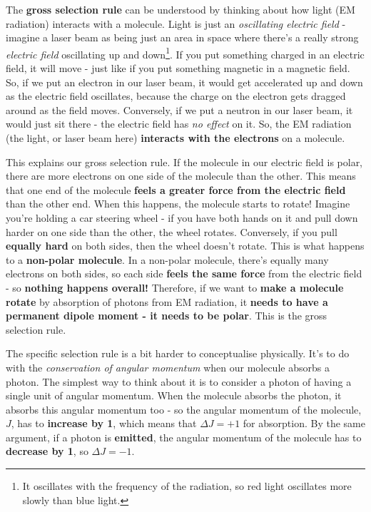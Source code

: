 \documentclass{memoir}[11pt,oneside,a4paper,openany]
\begin{document}
The \textbf{gross selection rule} can be understood by thinking about how light (EM radiation) interacts with a molecule. Light is just an \emph{oscillating electric field} - imagine a laser beam as being just an area in space where there's a really strong \emph{electric field} oscillating up and down\footnote{It oscillates with the frequency of the radiation, so red light oscillates more slowly than blue light.}. If you put something charged in an electric field, it will move - just like if you put something magnetic in a magnetic field. So, if we put an electron in our laser beam, it would get accelerated up and down as the electric field oscillates, because the charge on the electron gets dragged around as the field moves. Conversely, if we put a neutron in our laser beam, it would just sit there - the electric field has \emph{no effect} on it. So, the EM radiation (the light, or laser beam here) \textbf{interacts with the electrons} on a molecule. 

This explains our gross selection rule. If the molecule in our electric field is polar, there are more electrons on one side of the molecule than the other. This means that one end of the molecule \textbf{feels a greater force from the electric field} than the other end. When this happens, the molecule starts to rotate! Imagine you're holding a car steering wheel - if you have both hands on it and pull down harder on one side than the other, the wheel rotates. Conversely, if you pull \textbf{equally hard} on both sides, then the wheel doesn't rotate. This is what happens to a \textbf{non-polar molecule}. In a non-polar molecule, there's equally many electrons on both sides, so each side \textbf{feels the same force} from the electric field - so \textbf{nothing happens overall!} Therefore, if we want to \textbf{make a molecule rotate} by absorption of photons from EM radiation, it \textbf{needs to have a permanent dipole moment - it needs to be polar}. This is the gross selection rule.

The specific selection rule is a bit harder to conceptualise physically. It's to do with the \emph{conservation of angular momentum} when our molecule absorbs a photon. The simplest way to think about it is to consider a photon of having a single unit of angular momentum. When the molecule absorbs the photon, it absorbs this angular momentum too - so the angular momentum of the molecule, $J$, has to \textbf{increase by 1}, which means that $\Delta J = +1$ for absorption. By the same argument, if a photon is \textbf{emitted}, the angular momentum of the molecule has to \textbf{decrease by 1}, so $\Delta J = -1$. 
\end{document}
